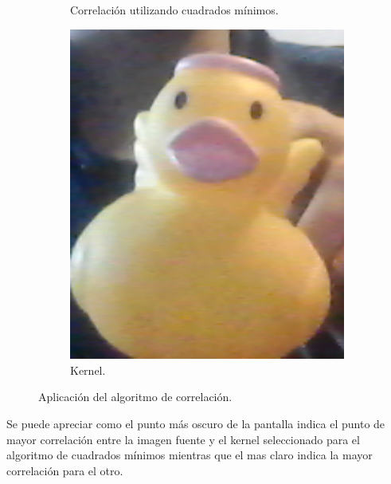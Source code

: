 \begin{figure}[H]
\begin{subfigure}{.4\textwidth}
		\caption{Correlación utilizando cuadrados mínimos.}
		\label{fig:sqdiff}
	\end{subfigure}
	\begin{subfigure}{.1\textwidth}
		\centering
		\includegraphics[width=1.2\textwidth]{Imagenes/kernel.png}
		\caption{Kernel.}
		\label{fig:kernel}
	\end{subfigure}
	\caption{Aplicación del algoritmo de correlación.}
	\label{fig:corrtest}
\end{figure}
Se puede apreciar como el punto más oscuro de la pantalla indica el punto de mayor correlación entre la imagen fuente y el kernel seleccionado para el algoritmo de cuadrados mínimos mientras que el mas claro indica la mayor correlación para el otro. 
